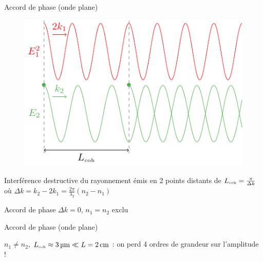 \documentclass{beamer}
\begin{document}
\begin{frame}{Accord de phase (onde plane)}

\begin{figure}
\centering
\includegraphics[scale=0.9]{img/accord.pdf}
\end{figure}
\vspace{-0.5cm}
Interférence destructive du rayonnement émis en 2 points distants de $L_{\mathrm{\scriptscriptstyle {coh}}} = \frac{\pi}{\Delta k}$ où $\Delta k = k_2 - 2 k_1 = \frac{2\pi}{\lambda_2} \left(n_2 - n_1\right)$

Accord de phase $\Delta k = 0$, $n_1 = n_2$ exclu
\end{frame}

\begin{frame}{Accord de phase (onde plane)}
\centering

\begin{beamerboxesrounded}[width=0.8\textwidth]{}
$n_1\neq n_2$, $L_{\mathrm{\scriptscriptstyle {coh}}} \approx \SI{3}{\micro\meter} \ll L = \SI{2}{cm}$ : on perd 4 ordres de grandeur sur l'amplitude !
\end{beamerboxesrounded}
\end{frame}
\end{document}
